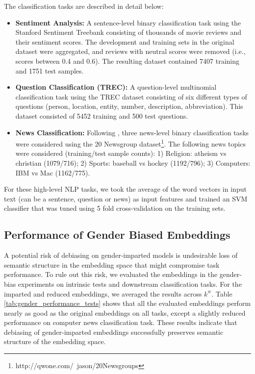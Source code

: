\documentclass[11pt,a4paper]{article}
\begin{document}
The classification tasks are described in detail below:
\begin{itemize}
    \item \textbf{Sentiment Analysis:} A sentence-level binary classification task using the Stanford Sentiment Treebank consisting of thousands of movie reviews \citep{socher13treebank} and their sentiment scores. The development and training sets in the original dataset were aggregated, and reviews with neutral scores were removed (i.e., scores between 0.4 and 0.6). The resulting dataset contained 7407 training and 1751 test samples.
    
    \item \textbf{Question Classification (TREC):} A question-level multinomial classification task using the TREC dataset \citep{li06learning} consisting of six different types of questions (person, location, entity, number, description, abbreviation). This dataset consisted of 5452 training and 500 test questions.
    
    \item \textbf{News Classification:} Following \citep{faruqui15sparse}, three news-level binary classification tasks were considered using the 20 Newsgroup dataset\footnote{http://qwone.com/~jason/20Newsgroups}. The following news topics were considered (training/test sample counts): 1) Religion: atheism vs christian (1079/716); 2) Sports: baseball vs hockey (1192/796); 3) Computers: IBM vs Mac (1162/775).
\end{itemize}

For these high-level NLP tasks, we took the average of the word vectors in input text (can be a sentence, question or news) as input features and trained an SVM classifier that was tuned using 5 fold cross-validation on the training sets. 






\subsection{Performance of Gender Biased Embeddings}

A potential risk of debiasing on gender-imparted models is undesirable loss of semantic structure in the embedding space that might compromise task performance. To rule out this risk, we evaluated the embeddings in the gender-bias experiments on intrinsic tests and downstream classification tasks. For the imparted and reduced embeddings, we averaged the results across $k^w$. Table \ref{tab:gender_performance_tests} shows that all the evaluated embeddings perform nearly as good as the original embeddings on all tasks, except a slightly reduced performance on computer news classification task. These results indicate that debiasing of gender-imparted embeddings successfully preserves semantic structure of the embedding space.
\end{document}
